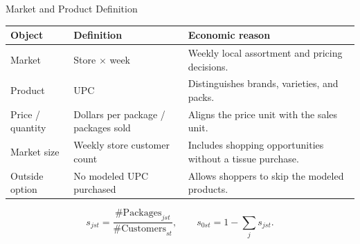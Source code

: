 \documentclass[aspectratio=169,11pt]{beamer}
\begin{document}
\begin{frame}{Market and Product Definition}
\small\renewcommand\arraystretch{1.02}
\begin{tabularx}{\textwidth}{@{}L{.18\textwidth}L{.25\textwidth}X@{}}
\toprule
Object & Definition & Economic reason \\
\midrule
Market & Store $\times$ week & Weekly local assortment and pricing decisions. \\
Product & UPC & Distinguishes brands, varieties, and packs. \\
Price / quantity & Dollars per package / packages sold & Aligns the price unit with the sales unit. \\
Market size & Weekly store customer count & Includes shopping opportunities without a tissue purchase. \\
Outside option & No modeled UPC purchased & Allows shoppers to skip the modeled products. \\
\bottomrule
\end{tabularx}\par
\vspace{0mm}
\[
s_{jst}=\frac{\text{\#Packages}_{jst}}{\text{\#Customers}_{st}},
\qquad s_{0st}=1-\sum_j s_{jst}.
\]
\par\vspace{-1mm}
\end{frame}
\end{document}
